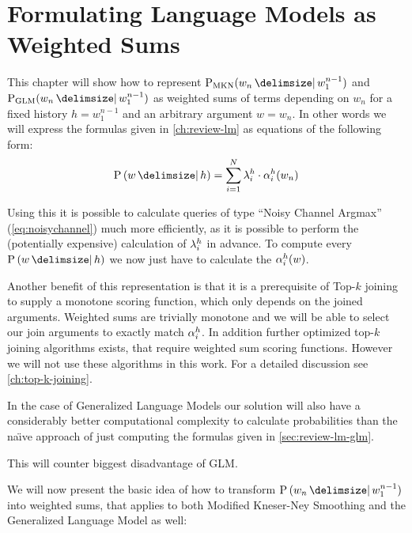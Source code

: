 \chapter{Formulating Language Models as Weighted Sums}
\label{ch:weightedsum}


This chapter will show how to represent  $\ProbMKN{w_n}{w_1^{n-1}}$ and
$\ProbGLM{w_n}{w_1^{n-1}}$ as weighted sums of terms depending on $w_n$ for a
fixed history $h = w_1^{n-1}$ and an  arbitrary argument $w = w_n$.
In other words we will express the formulas given in \cref{ch:review-lm} as
equations of the following form:
\begin{equation}
  \Prob{w}{h} = \sum_{i = 1}^{N} \SumWeight_i^h \cdot \SumArg_i^h(w_n)
\end{equation}

Using this it is possible to calculate queries of type ``Noisy Channel Argmax''
(\cref{eq:noisychannel}) much more efficiently, as it is possible to perform the
(potentially expensive) calculation of $\lambda_i^h$ in advance.
To compute every $\Prob{w}{h}$ we now just have to calculate the
$\alpha_i^h(w)$.

Another benefit of this representation is that it is a prerequisite of Top-$k$
joining to supply a monotone scoring function, which only depends on the
joined arguments.
Weighted sums are trivially monotone  and we will be able to
select our join arguments to exactly match $\alpha_i^h$.
In addition further optimized top-$k$ joining algorithms exists, that require
weighted sum scoring functions.
However we will not use these algorithms in this work.
For a detailed discussion see \cref{ch:top-k-joining}.

In the case of Generalized Language Models our solution will also have a
considerably better computational complexity to calculate probabilities than the
na{\"\i}ve  approach of just computing
the formulas given in
\cref{sec:review-lm-glm}.
\begin{draft}
This will counter biggest disadvantage of GLM.
\end{draft}

We will now present the basic idea of how to transform $\Prob{w_n}{w_1^{n-1}}$
into weighted sums, that applies to both Modified Kneser-Ney Smoothing and
the Generalized Language Model as well:

